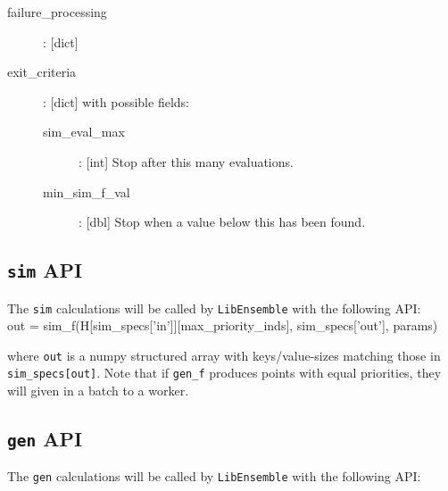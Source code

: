 \documentclass{article}
\newenvironment{allintypewriter}{\ttfamily}{\par}
\newcommand{\libE}{\texttt{LibEnsemble}\xspace}
\begin{document}
\begin{allintypewriter}
\begin{description}
    \item[failure\_processing]: [dict]

    \item[exit\_criteria]: [dict] with possible fields:
      \begin{description}
        \item[sim\_eval\_max]: [int] Stop after this many evaluations.
        \item[min\_sim\_f\_val]: [dbl] Stop when a value below this has been found.
      \end{description}


  \end{description}
\end{allintypewriter}
        

\subsection{\texttt{sim} API}
The \texttt{sim} calculations will be called by \libE with the following API:\\

\begin{allintypewriter}
  out = sim\_f(H[sim\_specs['in']][max\_priority\_inds], sim\_specs['out'],
  params)\\
\end{allintypewriter}

where \texttt{out} is a numpy structured array with keys/value-sizes matching
those in \texttt{sim\_specs[out]}. Note that if \texttt{gen\_f} produces points
with equal priorities, they will given in a batch to a worker.

\subsection{\texttt{gen} API}
The \texttt{gen} calculations will be called by \libE with the following API:\\
\end{document}
